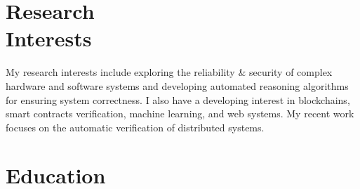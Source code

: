 \documentclass[line,margin,letter]{resume}
\begin{document}
\begin{resume}

\section{\mysidestyle Research\\Interests}
    My research interests include exploring the reliability \& security of complex hardware and software systems and developing automated reasoning algorithms for ensuring system correctness. I also have a developing interest in blockchains, smart contracts verification, machine learning, and web systems. My recent work focuses on the automatic verification of distributed systems.


\section{\mysidestyle Education}


\end{resume}
\end{document}
